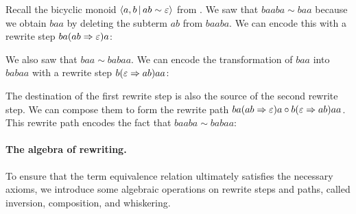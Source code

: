 \documentclass[../generics]{subfiles}
\begin{document}
\begin{example}\label{bicyclic 2}
Recall the bicyclic monoid $\langle a, b\,|\,ab\sim\varepsilon\rangle$ from . We saw that $baaba\sim baa$ because we obtain $baa$ by deleting the subterm $ab$ from $baaba$. We can encode this with a rewrite step $ba(ab\Rightarrow\varepsilon) a$:
\begin{center}
\end{center}
We also saw that $baa\sim babaa$. We can encode the transformation of $baa$ into $babaa$ with a rewrite step $b(\varepsilon\Rightarrow ab) aa$:
\begin{center}
\end{center}
The destination of the first rewrite step is also the source of the second rewrite step. We can compose them to form the rewrite path $ba(ab\Rightarrow\varepsilon) a\circ b(\varepsilon\Rightarrow ab) aa$. This rewrite path encodes the fact that $baaba\sim babaa$:
\begin{center}
\end{center}
\end{example}

\paragraph{The algebra of rewriting.} To ensure that the term equivalence relation ultimately satisfies the necessary axioms, we introduce some algebraic operations on rewrite steps and paths, called inversion, composition, and whiskering.
\end{document}
